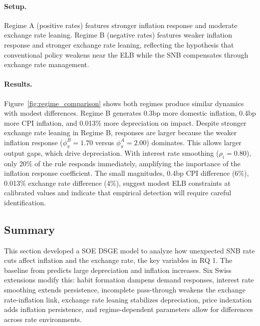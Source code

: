\documentclass[12pt,a4paper]{article}
\begin{document}
\paragraph{Setup.}
Regime A (positive rates) features stronger inflation response and moderate exchange rate leaning. Regime B (negative rates) features weaker inflation response and stronger exchange rate leaning, reflecting the hypothesis that conventional policy weakens near the ELB while the SNB compensates through exchange rate management.

\paragraph{Results.}
Figure~\ref{fig:regime_comparison} shows both regimes produce similar dynamics 
with modest differences. Regime B generates 0.3bp more domestic inflation, 0.4bp more CPI inflation, and 0.013\% more depreciation on impact. Despite stronger exchange rate leaning in Regime B, responses are larger because the weaker inflation response ($\phi_\pi^B = 1.70$ versus $\phi_\pi^A = 2.00$) dominates. This allows larger output gaps, which drive depreciation. With interest rate smoothing ($\rho_i = 0.80$), only 20\% of the rule responds immediately, amplifying the importance of the inflation response coefficient. The small magnitudes, 0.4bp CPI difference (6\%), 0.013\% exchange rate difference (4\%), suggest modest ELB constraints at calibrated values and indicate that empirical detection will require careful identification.

\subsection{Summary}
\label{subsec:dsge_summary}
This section developed a SOE DSGE model to analyze how unexpected SNB rate cuts affect inflation and the exchange rate, the key variables in RQ 1. The baseline from \citet{gali2008} predicts large depreciation and inflation increases. Six Swiss extensions modify this: habit formation dampens demand responses, interest rate smoothing extends persistence, incomplete pass-through weakens the exchange rate-inflation link, exchange rate leaning stabilizes depreciation, price indexation adds inflation persistence, and regime-dependent parameters allow for differences across rate environments.
\end{document}
